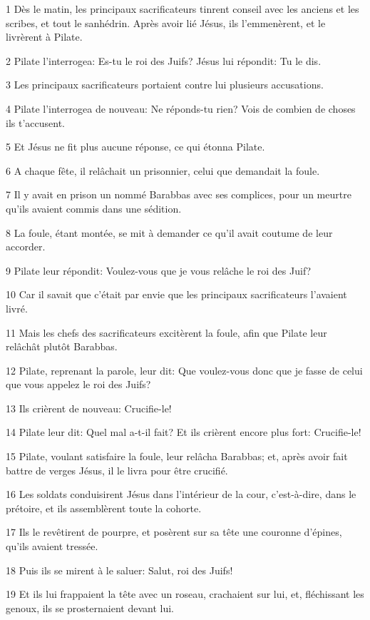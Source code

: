 \par 1 Dès le matin, les principaux sacrificateurs tinrent conseil avec les anciens et les scribes, et tout le sanhédrin. Après avoir lié Jésus, ils l'emmenèrent, et le livrèrent à Pilate.
\par 2 Pilate l'interrogea: Es-tu le roi des Juifs? Jésus lui répondit: Tu le dis.
\par 3 Les principaux sacrificateurs portaient contre lui plusieurs accusations.
\par 4 Pilate l'interrogea de nouveau: Ne réponds-tu rien? Vois de combien de choses ils t'accusent.
\par 5 Et Jésus ne fit plus aucune réponse, ce qui étonna Pilate.
\par 6 A chaque fête, il relâchait un prisonnier, celui que demandait la foule.
\par 7 Il y avait en prison un nommé Barabbas avec ses complices, pour un meurtre qu'ils avaient commis dans une sédition.
\par 8 La foule, étant montée, se mit à demander ce qu'il avait coutume de leur accorder.
\par 9 Pilate leur répondit: Voulez-vous que je vous relâche le roi des Juif?
\par 10 Car il savait que c'était par envie que les principaux sacrificateurs l'avaient livré.
\par 11 Mais les chefs des sacrificateurs excitèrent la foule, afin que Pilate leur relâchât plutôt Barabbas.
\par 12 Pilate, reprenant la parole, leur dit: Que voulez-vous donc que je fasse de celui que vous appelez le roi des Juifs?
\par 13 Ils crièrent de nouveau: Crucifie-le!
\par 14 Pilate leur dit: Quel mal a-t-il fait? Et ils crièrent encore plus fort: Crucifie-le!
\par 15 Pilate, voulant satisfaire la foule, leur relâcha Barabbas; et, après avoir fait battre de verges Jésus, il le livra pour être crucifié.
\par 16 Les soldats conduisirent Jésus dans l'intérieur de la cour, c'est-à-dire, dans le prétoire, et ils assemblèrent toute la cohorte.
\par 17 Ils le revêtirent de pourpre, et posèrent sur sa tête une couronne d'épines, qu'ils avaient tressée.
\par 18 Puis ils se mirent à le saluer: Salut, roi des Juifs!
\par 19 Et ils lui frappaient la tête avec un roseau, crachaient sur lui, et, fléchissant les genoux, ils se prosternaient devant lui.
